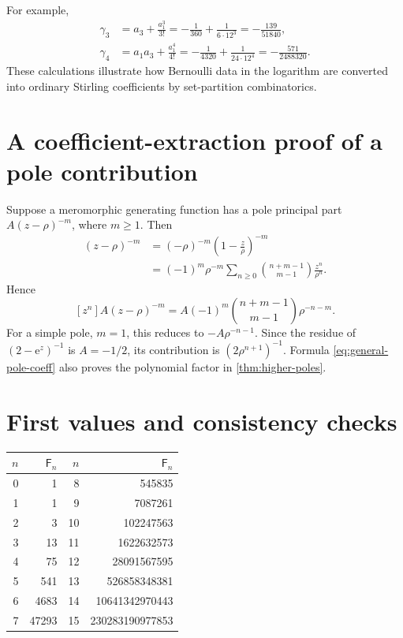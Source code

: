 \documentclass[11pt,a4paper]{article}
\theoremstyle{definition}
\theoremstyle{remark}
\newcommand{\Fub}{\mathsf F}
\newcommand{\e}{\mathrm e}
\newcommand{\coeff}[2]{\left[#1^{#2}\right]}
\begin{document}
For example,
\begin{align*}
 \gamma_3
 &=a_3+\frac{a_1^3}{3!}
 =-\frac1{360}+\frac1{6\cdot12^3}
 =-\frac{139}{51840},\\
 \gamma_4
 &=a_1a_3+\frac{a_1^4}{4!}
 =-\frac1{4320}+\frac1{24\cdot12^4}
 =-\frac{571}{2488320}.
\end{align*}
These calculations illustrate how Bernoulli data in the logarithm are converted
into ordinary Stirling coefficients by set-partition combinatorics.

\section{A coefficient-extraction proof of a pole contribution}

Suppose a meromorphic generating function has a pole principal part
\(
 A(z-\rho)^{-m}
\), where \(m\ge1\).  Then
\begin{align*}
 (z-\rho)^{-m}
 &=(-\rho)^{-m}\left(1-\frac z\rho\right)^{-m}\\
 &=(-1)^m\rho^{-m}
   \sum_{n\ge0}\binom{n+m-1}{m-1}\frac{z^n}{\rho^n}.
\end{align*}
Hence
\begin{equation}\label{eq:general-pole-coeff}
 \coeff{z}{n}A(z-\rho)^{-m}
 =A(-1)^m\binom{n+m-1}{m-1}\rho^{-n-m}.
\end{equation}
For a simple pole, \(m=1\), this reduces to
\(
 -A\rho^{-n-1}
\).  Since the residue of \((2-\e^z)^{-1}\) is \(A=-1/2\), its contribution is
\(
 (2\rho^{n+1})^{-1}
\).  Formula \eqref{eq:general-pole-coeff} also proves the polynomial factor in
\cref{thm:higher-poles}.

\section{First values and consistency checks}

\begin{center}
\begin{tabular}{@{}r r@{\qquad}r r@{}}
\toprule
\(n\)&\(\Fub_n\)&\(n\)&\(\Fub_n\)\\
\midrule
0&1&8&545835\\
1&1&9&7087261\\
2&3&10&102247563\\
3&13&11&1622632573\\
4&75&12&28091567595\\
5&541&13&526858348381\\
6&4683&14&10641342970443\\
7&47293&15&230283190977853\\
\bottomrule
\end{tabular}
\end{center}
\end{document}
